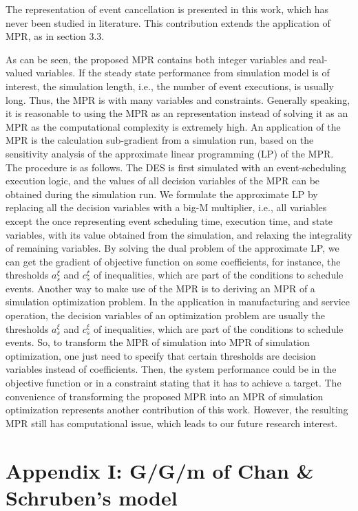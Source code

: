 \documentclass[]{interact}
\theoremstyle{plain}%
\theoremstyle{definition}
\theoremstyle{remark}
\begin{document}
The representation of event cancellation is presented in this work, which has never been studied in literature. This contribution extends the application of MPR, as in section 3.3.

As can be seen, the proposed MPR contains both integer variables and real-valued variables. If the steady state performance from simulation model is of interest, the simulation length, i.e., the number of event executions, is usually long. Thus, the MPR is with many variables and constraints. Generally speaking, it is reasonable to using the MPR as an representation instead of solving it as an MPR as the computational complexity is extremely high. An application of the MPR is the calculation sub-gradient from a simulation run, based on the sensitivity analysis of the approximate linear programming (LP) of the MPR. The procedure is as follows. The DES is first simulated with an event-scheduling execution logic, and the values of all decision variables of the MPR can be obtained during the simulation run. We formulate the approximate LP by replacing all the decision variables with a big-M multiplier, i.e., all variables except the once representing event scheduling time, execution time, and state variables, with its value obtained from the simulation, and relaxing the integrality of remaining variables. By solving the dual problem of the approximate LP, we can get the gradient of objective function on some coefficients, for instance, the thresholds $a^{\xi}_s$ and $c^{\xi}_s$ of inequalities, which are part of the conditions to schedule events. Another way to make use of the MPR is to deriving an MPR of a simulation optimization problem. In the application in manufacturing and service operation, the decision variables of an optimization problem are usually the thresholds $a^{\xi}_s$ and $c^{\xi}_s$ of inequalities, which are part of the conditions to schedule events. So, to transform the MPR of simulation into MPR of simulation optimization, one just need to specify that certain thresholds are decision variables instead of coefficients. Then, the system performance could be in the objective function or in a constraint stating that it has to achieve a target. The convenience of transforming the proposed MPR into an MPR of simulation optimization represents another contribution of this work. However, the resulting MPR still has computational issue, which leads to our future research interest.

\newpage
\section*{Appendix I: G/G/m of Chan \& Schruben's model}
\end{document}
